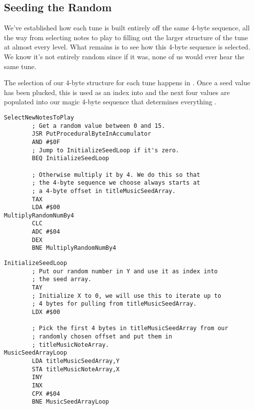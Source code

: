 \subsection{Seeding the Random}

We've established how each tune is built entirely off the same 4-byte sequence, all the way from selecting
notes to play to filling out the larger structure of the tune at almost every level. What remains is
to see how this 4-byte sequence is selected. We know it's not entirely random since if it was, none of us
would ever hear the same tune. 

The selection of our 4-byte structure for each tune happens in . Once a seed
value has been plucked, this is used as an index into  and the next four values
are populated into our magic 4-byte sequence that determines everything .

\begin{lstlisting}[caption=Put a seed byte in the accumulator and multiply this by 4 if it's not zero. This
gives us what we need for the next step.]
SelectNewNotesToPlay
        ; Get a random value between 0 and 15.
        JSR PutProceduralByteInAccumulator
        AND #$0F
        ; Jump to InitializeSeedLoop if it's zero.
        BEQ InitializeSeedLoop

        ; Otherwise multiply it by 4. We do this so that
        ; the 4-byte sequence we choose always starts at
        ; a 4-byte offset in titleMusicSeedArray.
        TAX
        LDA #$00
MultiplyRandomNumBy4   
        CLC
        ADC #$04
        DEX
        BNE MultiplyRandomNumBy4
\end{lstlisting}

\begin{lstlisting}[caption=Use our seed value to pull 4 bytes from \icode{titleMusicSeedArray} and
store them in \icode{titleMusicNoteArray}]
InitializeSeedLoop   
        ; Put our random number in Y and use it as index into
        ; the seed array.
        TAY
        ; Initialize X to 0, we will use this to iterate up to
        ; 4 bytes for pulling from titleMusicSeedArray.
        LDX #$00

        ; Pick the first 4 bytes in titleMusicSeedArray from our
        ; randomly chosen offset and put them in
        ; titleMusicNoteArray.
MusicSeedArrayLoop   
        LDA titleMusicSeedArray,Y
        STA titleMusicNoteArray,X
        INY
        INX
        CPX #$04
        BNE MusicSeedArrayLoop
\end{lstlisting}


